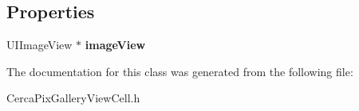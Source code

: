 \subsection*{Properties}
\begin{DoxyCompactItemize}
\item 
\hypertarget{interface_cerca_pix_gallery_view_cell_a7060cde83918b75cf28ea9073f0fab8c}{U\-I\-Image\-View $\ast$ {\bfseries image\-View}}\label{interface_cerca_pix_gallery_view_cell_a7060cde83918b75cf28ea9073f0fab8c}

\end{DoxyCompactItemize}


The documentation for this class was generated from the following file\-:\begin{DoxyCompactItemize}
\item 
Cerca\-Pix\-Gallery\-View\-Cell.\-h\end{DoxyCompactItemize}
